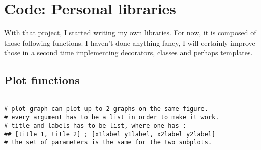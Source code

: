 \chapter{Code: Personal libraries}

With that project, I started writing my own libraries. For now, it is composed of those following functions. I haven't done anything fancy, I will certainly improve those in a second time implementing decorators, classes and perhaps templates.

\section{Plot functions}

\begin{Verbatim}[fontsize=\tiny]

# plot graph can plot up to 2 graphs on the same figure.
# every argument has to be a list in order to make it work.
# title and labels has to be list, where one has :
## [title 1, title 2] ; [x1label y1label, x2label y2label]
# the set of parameters is the same for the two subplots.


\end{Verbatim}
